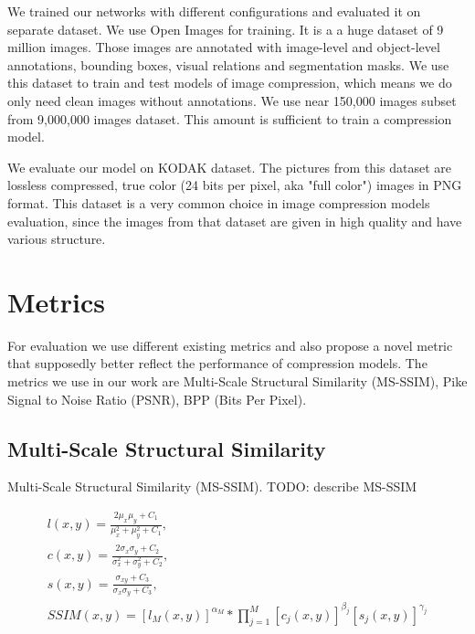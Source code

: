 We trained our networks with different configurations and evaluated it on separate dataset. We use Open Images \cite{OpenImages2} for training. It is a a huge dataset of 9 million images. Those images are annotated with image-level and object-level annotations, bounding boxes, visual relations and segmentation masks. We use this dataset to train and test models of image compression, which means we do only need clean images without annotations. We use near 150,000 images subset from 9,000,000 images dataset. This amount is sufficient to train a compression model.

We evaluate our model on KODAK \cite{kodak} dataset. The pictures from this dataset are lossless compressed, true color (24 bits per pixel, aka "full color") images in PNG format. This dataset is a very common choice in image compression models evaluation, since the images from that dataset are given in high quality and have various structure.

\section{Metrics}

For evaluation we use different existing metrics and also propose a novel metric that supposedly better reflect the performance of compression models. The metrics we use in our work are Multi-Scale Structural Similarity (MS-SSIM), Pike Signal to Noise Ratio (PSNR), BPP (Bits Per Pixel).

\subsection{Multi-Scale Structural Similarity}

Multi-Scale Structural Similarity (MS-SSIM). TODO: describe MS-SSIM

\begin{equation}
    \label{eq:ms-ssim}
    \begin{split}
        l(x, y) = \frac{2\mu_x\mu_y + C_1}{\mu_x^2 + \mu_y^2 + C_1},\\
        c(x, y) = \frac{2\sigma_x\sigma_y + C_2}{\sigma_x^2 + \sigma_y^2 + C_2},\\
        s(x, y) = \frac{\sigma_{xy} + C_3}{\sigma_x\sigma_y + C_3},\\
        SSIM(x, y) = [l_M(x, y)]^{\alpha_M} * \prod_{j=1}^{M}[c_j(x, y)]^{\beta_j}[s_j(x, y)]^{\gamma_j}
    \end{split}
\end{equation}

